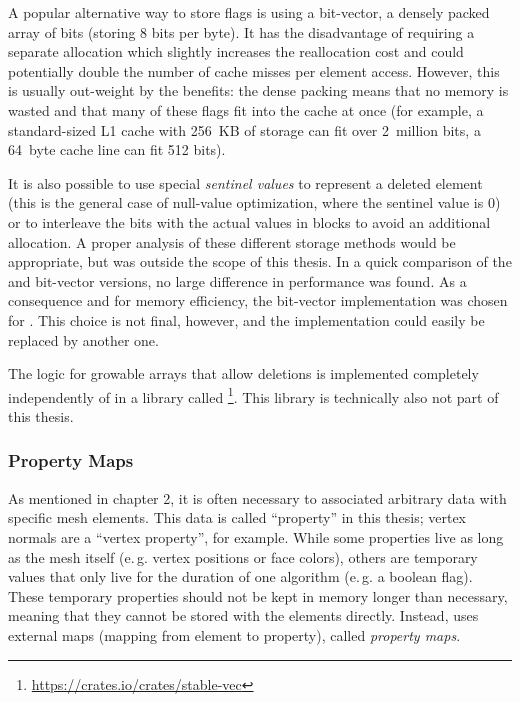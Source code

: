 A popular alternative way to store  flags is using a bit-vector, a densely packed array of bits (storing 8 bits per byte).
It has the disadvantage of requiring a separate allocation which slightly increases the reallocation cost and could potentially double the number of cache misses per element access.
However, this is usually out-weight by the benefits:
the dense packing means that no memory is wasted and that many of these flags fit into the cache at once (for example, a standard-sized L1 cache with 256~KB of storage can fit over 2~million bits, a 64~byte cache line can fit 512 bits).

It is also possible to use special \emph{sentinel values} to represent a deleted element (this is the general case of null-value optimization, where the sentinel value is 0) or to interleave the bits with the actual values in blocks to avoid an additional allocation.
A proper analysis of these different storage methods would be appropriate, but was outside the scope of this thesis.
In a quick comparison of the  and bit-vector versions, no large difference in performance was found.
As a consequence and for memory efficiency, the bit-vector implementation was chosen for .
This choice is not final, however, and the implementation could easily be replaced by another one.

The logic for growable arrays that allow deletions is implemented completely independently of  in a library called \footnote{\url{https://crates.io/crates/stable-vec}}.
This library is technically also not part of this thesis.






\subsubsection*{Property Maps}

As mentioned in chapter 2, it is often necessary to associated arbitrary data with specific mesh elements.
This data is called \enquote{property} in this thesis; vertex normals are a \enquote{vertex property}, for example.
While some properties live as long as the mesh itself (e.\,g. vertex positions or face colors),  others are temporary values that only live for the duration of one algorithm (e.\,g. a boolean  flag).
These temporary properties should not be kept in memory longer than necessary, meaning that they cannot be stored with the elements directly.
Instead,  uses external maps (mapping from element to property), called \emph{property maps}.

